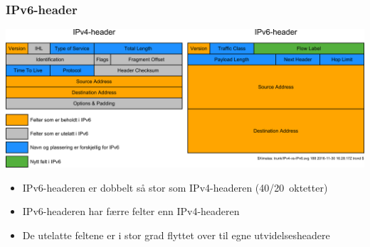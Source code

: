 \begin{frame}%
  \frametitle{IPv6-header}
  \begin{center}
      {\includegraphics[scale=.17]{IPv4-vs-IPv6.pdf}}
  \end{center}

  \begin{itemize}
  \item IPv6-headeren er dobbelt så stor som IPv4-headeren
    (40/20~oktetter)
  \item IPv6-headeren har færre felter enn IPv4-headeren
  \item De utelatte feltene er i stor grad flyttet over til egne
    utvidelsesheadere
  \end{itemize}
\end{frame}

